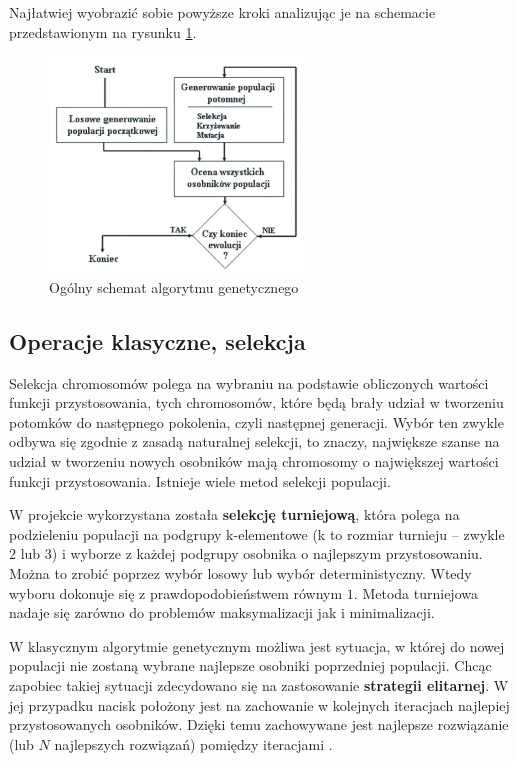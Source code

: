 \documentclass[twoside,12pt]{report}
\begin{document}
Najłatwiej wyobrazić sobie powyższe kroki analizując je na schemacie przedstawionym na rysunku \ref{fig:ogolny_schemat_alg_genetycznego}.

\begin{figure}[ht]
	\centering
	\includegraphics[width=0.6\textwidth]{img/ogolgene}
	\caption{Ogólny schemat algorytmu genetycznego}
	\label{fig:ogolny_schemat_alg_genetycznego}
\end{figure}

\subsection{Operacje klasyczne, selekcja}
Selekcja chromosomów polega na wybraniu na podstawie obliczonych wartości funkcji przystosowania, tych chromosomów, które będą brały udział w tworzeniu potomków do następnego pokolenia, czyli następnej generacji. Wybór ten zwykle odbywa się zgodnie z zasadą naturalnej selekcji, to znaczy, największe szanse na udział w tworzeniu nowych osobników mają chromosomy o największej wartości funkcji przystosowania. Istnieje wiele metod selekcji populacji.

W projekcie wykorzystana została \textbf{selekcję turniejową}, która polega na podzieleniu populacji na podgrupy k-elementowe (k to rozmiar turnieju – zwykle $2$ lub $3$) i wyborze z każdej podgrupy osobnika o najlepszym przystosowaniu. Można to zrobić poprzez wybór losowy lub wybór deterministyczny. Wtedy wyboru dokonuje się z prawdopodobieństwem równym $1$. Metoda turniejowa nadaje się zarówno do problemów maksymalizacji jak i minimalizacji.

W klasycznym algorytmie genetycznym możliwa jest sytuacja, w której do nowej populacji nie zostaną wybrane najlepsze osobniki poprzedniej populacji. Chcąc zapobiec takiej sytuacji zdecydowano się na zastosowanie \textbf{strategii elitarnej}. W jej przypadku nacisk położony jest na zachowanie w kolejnych iteracjach najlepiej przystosowanych osobników. Dzięki temu zachowywane jest najlepsze rozwiązanie (lub $N$ najlepszych rozwiązań) pomiędzy iteracjami \cite{genetyczne-teoria}. 
\end{document}
